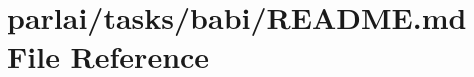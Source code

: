 \hypertarget{parlai_2tasks_2babi_2README_8md}{}\section{parlai/tasks/babi/\+R\+E\+A\+D\+ME.md File Reference}
\label{parlai_2tasks_2babi_2README_8md}
